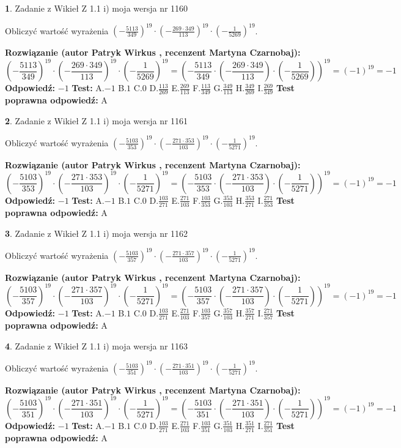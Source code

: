 \documentclass[12pt, a4paper]{article}
\theoremstyle{definition} %
\newtheorem{zad}{}
\newcommand{\zadStart}[1]{\begin{zad}#1\newline}
\newcommand{\zadStop}{\end{zad}}
\newcommand{\rozwStart}[2]{\noindent \textbf{Rozwiązanie (autor #1 , recenzent #2): }\newline}
\newcommand{\rozwStop}{\newline}
\newcommand{\odpStart}{\noindent \textbf{Odpowiedź:}\newline}
\newcommand{\odpStop}{\newline}
\newcommand{\testStart}{\noindent \textbf{Test:}\newline}
\newcommand{\testStop}{\newline}
\newcommand{\kluczStart}{\noindent \textbf{Test poprawna odpowiedź:}\newline}
\newcommand{\kluczStop}{\newline}
\begin{document}
\zadStart{Zadanie z Wikieł Z 1.1 i) moja wersja nr 1160}

Obliczyć wartość wyrażenia $(-\frac{5113}{349})^{19} \cdot (-\frac{269 \cdot 349}{113})^{19} \cdot (-\frac{1}{5269})^{19}$.
\zadStop
\rozwStart{Patryk Wirkus}{Martyna Czarnobaj}
$$(-\frac{5113}{349})^{19} \cdot (-\frac{269 \cdot 349}{113})^{19} \cdot (-\frac{1}{5269})^{19} = (-\frac{5113}{349} \cdot (-\frac{269 \cdot 349}{113}) \cdot (-\frac{1}{5269}))^{19} = (-1)^{19} = -1$$
\rozwStop
\odpStart
$-1$
\odpStop
\testStart
A.$-1$ B.$1$ C.$0$ D.$\frac{113}{269}$ E.$\frac{269}{113}$
F.$\frac{113}{349}$ G.$\frac{349}{113}$
H.$\frac{349}{269}$
I.$\frac{269}{349}$
\testStop
\kluczStart
A
\kluczStop



\zadStart{Zadanie z Wikieł Z 1.1 i) moja wersja nr 1161}

Obliczyć wartość wyrażenia $(-\frac{5103}{353})^{19} \cdot (-\frac{271 \cdot 353}{103})^{19} \cdot (-\frac{1}{5271})^{19}$.
\zadStop
\rozwStart{Patryk Wirkus}{Martyna Czarnobaj}
$$(-\frac{5103}{353})^{19} \cdot (-\frac{271 \cdot 353}{103})^{19} \cdot (-\frac{1}{5271})^{19} = (-\frac{5103}{353} \cdot (-\frac{271 \cdot 353}{103}) \cdot (-\frac{1}{5271}))^{19} = (-1)^{19} = -1$$
\rozwStop
\odpStart
$-1$
\odpStop
\testStart
A.$-1$ B.$1$ C.$0$ D.$\frac{103}{271}$ E.$\frac{271}{103}$
F.$\frac{103}{353}$ G.$\frac{353}{103}$
H.$\frac{353}{271}$
I.$\frac{271}{353}$
\testStop
\kluczStart
A
\kluczStop



\zadStart{Zadanie z Wikieł Z 1.1 i) moja wersja nr 1162}

Obliczyć wartość wyrażenia $(-\frac{5103}{357})^{19} \cdot (-\frac{271 \cdot 357}{103})^{19} \cdot (-\frac{1}{5271})^{19}$.
\zadStop
\rozwStart{Patryk Wirkus}{Martyna Czarnobaj}
$$(-\frac{5103}{357})^{19} \cdot (-\frac{271 \cdot 357}{103})^{19} \cdot (-\frac{1}{5271})^{19} = (-\frac{5103}{357} \cdot (-\frac{271 \cdot 357}{103}) \cdot (-\frac{1}{5271}))^{19} = (-1)^{19} = -1$$
\rozwStop
\odpStart
$-1$
\odpStop
\testStart
A.$-1$ B.$1$ C.$0$ D.$\frac{103}{271}$ E.$\frac{271}{103}$
F.$\frac{103}{357}$ G.$\frac{357}{103}$
H.$\frac{357}{271}$
I.$\frac{271}{357}$
\testStop
\kluczStart
A
\kluczStop



\zadStart{Zadanie z Wikieł Z 1.1 i) moja wersja nr 1163}

Obliczyć wartość wyrażenia $(-\frac{5103}{351})^{19} \cdot (-\frac{271 \cdot 351}{103})^{19} \cdot (-\frac{1}{5271})^{19}$.
\zadStop
\rozwStart{Patryk Wirkus}{Martyna Czarnobaj}
$$(-\frac{5103}{351})^{19} \cdot (-\frac{271 \cdot 351}{103})^{19} \cdot (-\frac{1}{5271})^{19} = (-\frac{5103}{351} \cdot (-\frac{271 \cdot 351}{103}) \cdot (-\frac{1}{5271}))^{19} = (-1)^{19} = -1$$
\rozwStop
\odpStart
$-1$
\odpStop
\testStart
A.$-1$ B.$1$ C.$0$ D.$\frac{103}{271}$ E.$\frac{271}{103}$
F.$\frac{103}{351}$ G.$\frac{351}{103}$
H.$\frac{351}{271}$
I.$\frac{271}{351}$
\testStop
\kluczStart
A
\kluczStop
\end{document}
